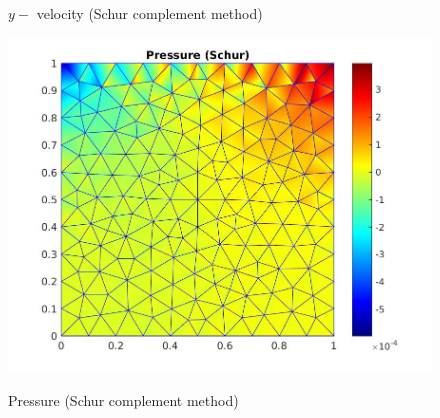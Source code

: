 \documentclass[a4paper]{book}
\begin{document}
\begin{figure}
\begin{minipage}[c]{0.3\textwidth}
    \caption{$y-$ velocity (Schur complement method)} \label{y_vel_stoke_schur_lid}
  \end{minipage}
  \begin{minipage}[c]{0.67\textwidth}
    \includegraphics[width=\textwidth]{lid_schur_pressure.jpg}
  \end{minipage}\hfill
  \begin{minipage}[c]{0.3\textwidth}
    \caption{Pressure (Schur complement method)} \label{pressure_stoke_schur_lid}
  \end{minipage}
\caption{\label{stoke_schur_lid}}
\end{figure}
\end{document}
